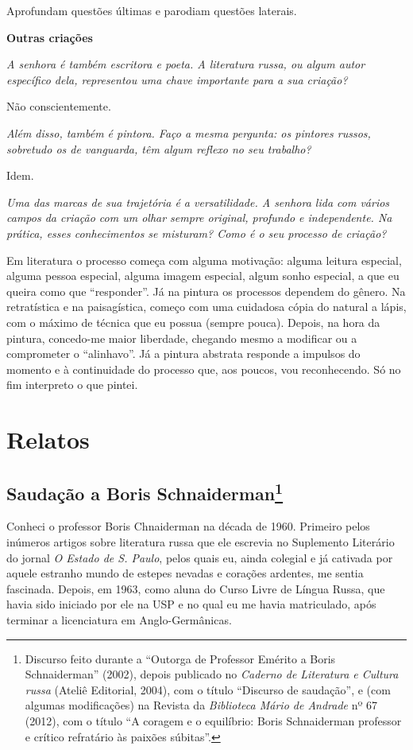 Aprofundam questões últimas e parodiam questões laterais.

\textbf{Outras criações}

\emph{A senhora é também escritora e poeta. A literatura russa, ou algum
autor específico dela, representou uma chave importante para a sua
criação?}

Não conscientemente.

\emph{Além disso, também é pintora. Faço a mesma pergunta: os pintores
russos, sobretudo os de vanguarda, têm algum reflexo no seu trabalho?}

Idem.

\emph{Uma das marcas de sua trajetória é a versatilidade. A senhora lida
com vários campos da criação com um olhar sempre original, profundo e
independente. Na prática, esses conhecimentos se misturam? Como é o seu
processo de criação?}

Em literatura o processo começa com alguma motivação: alguma leitura
especial, alguma pessoa especial, alguma imagem especial, algum sonho
especial, a que eu queira como que ``responder''. Já na pintura os
processos dependem do gênero. Na retratística e na paisagística, começo
com uma cuidadosa cópia do natural a lápis, com o máximo de técnica que
eu possua (sempre pouca). Depois, na hora da pintura, concedo-me maior
liberdade, chegando mesmo a modificar ou a comprometer o ``alinhavo''.
Já a pintura abstrata responde a impulsos do momento e à continuidade do
processo que, aos poucos, vou reconhecendo. Só no fim interpreto o que
pintei.

\part{Relatos}

\chapter{Saudação a Boris Schnaiderman\footnote{Discurso feito durante a
  ``Outorga de Professor Emérito a Boris Schnaiderman'' (2002), depois
  publicado no \emph{Caderno de Literatura e Cultura russa} (Ateliê
  Editorial, 2004), com o título ``Discurso de saudação'', e (com
  algumas modificações) na Revista da \emph{Biblioteca Mário de
  Andrade} nº 67 (2012), com o título ``A coragem e o equilíbrio: Boris
  Schnaiderman professor e crítico refratário às paixões súbitas''.}}

Conheci o professor Boris Chnaiderman na década de 1960. Primeiro pelos
inúmeros artigos sobre literatura russa que ele escrevia no Suplemento
Literário do jornal \emph{O Estado de S. Paulo}, pelos quais eu, ainda
colegial e já cativada por aquele estranho mundo de estepes nevadas e
corações ardentes, me sentia fascinada. Depois, em 1963, como aluna do
Curso Livre de Língua Russa, que havia sido iniciado por ele na USP e no
qual eu me havia matriculado, após terminar a licenciatura em
Anglo-Germânicas.

